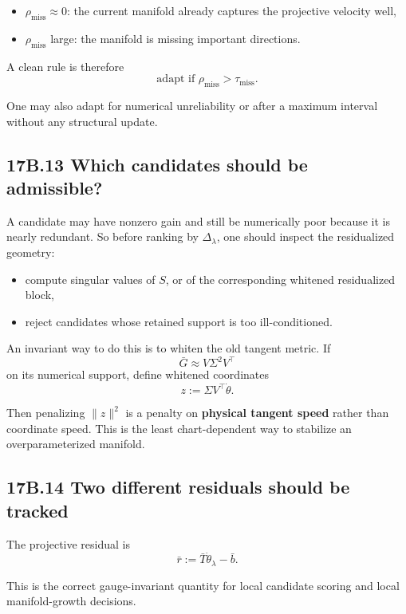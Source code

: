 \documentclass[11pt]{article}
\begin{document}
\begin{itemize}
\item $\rho_{\mathrm{miss}}\approx 0$: the current manifold already captures the projective velocity well,
\item $\rho_{\mathrm{miss}}$ large: the manifold is missing important directions.

\end{itemize}

A clean rule is therefore
\[
\text{adapt if }\rho_{\mathrm{miss}}>\tau_{\mathrm{miss}}.
\]

One may also adapt for numerical unreliability or after a maximum interval without any structural update.

\subsection*{17B.13 Which candidates should be admissible?}


A candidate may have nonzero gain and still be numerically poor because it is nearly redundant. So before ranking by $\Delta_\lambda$, one should inspect the residualized geometry:

\begin{itemize}
\item compute singular values of $S$, or of the corresponding whitened residualized block,
\item reject candidates whose retained support is too ill-conditioned.

\end{itemize}

An invariant way to do this is to whiten the old tangent metric. If
\[
\bar G\approx V\Sigma^2V^\top
\]
on its numerical support, define whitened coordinates
\[
z:=\Sigma V^\top\dot\theta.
\]

Then penalizing $\|z\|^2$ is a penalty on \textbf{physical tangent speed} rather than coordinate speed. This is the least chart-dependent way to stabilize an overparameterized manifold.

\subsection*{17B.14 Two different residuals should be tracked}


The projective residual is
\[
\bar r:=\bar T\dot\theta_\lambda-\bar b.
\]

This is the correct gauge-invariant quantity for local candidate scoring and local manifold-growth decisions.
\end{document}
